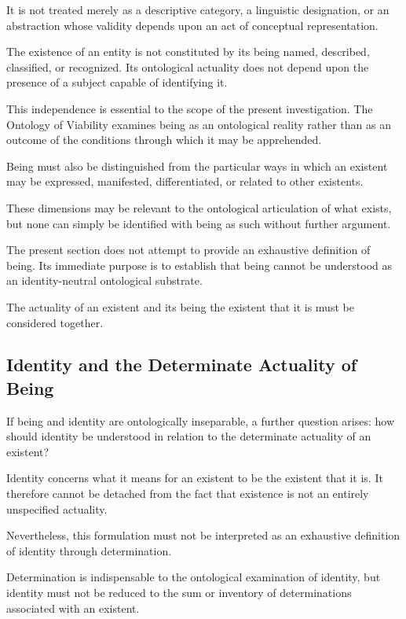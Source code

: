 It is not treated merely as a descriptive
category, a linguistic designation, or
an abstraction whose validity depends
upon an act of conceptual representation.

The existence of an entity is not constituted
by its being named, described, classified,
or recognized. Its ontological actuality
does not depend upon the presence of
a subject capable of identifying it.

This independence is essential to the
scope of the present investigation.
The Ontology of Viability examines being
as an ontological reality rather than
as an outcome of the conditions through
which it may be apprehended.

Being must also be distinguished from
the particular ways in which an existent
may be expressed, manifested, differentiated,
or related to other existents.

These dimensions may be relevant to the
ontological articulation of what exists,
but none can simply be identified with
being as such without further argument.

The present section does not attempt
to provide an exhaustive definition
of being. Its immediate purpose is
to establish that being cannot be
understood as an identity-neutral
ontological substrate.

The actuality of an existent and its
being the existent that it is must
be considered together.



\subsection{Identity and the Determinate Actuality of Being}

If being and identity are ontologically
inseparable, a further question arises:
how should identity be understood in
relation to the determinate actuality
of an existent?

Identity concerns what it means for
an existent to be the existent that it is.
It therefore cannot be detached from
the fact that existence is not an entirely
unspecified actuality.

Nevertheless, this formulation must not
be interpreted as an exhaustive definition
of identity through determination.

Determination is indispensable to the
ontological examination of identity,
but identity must not be reduced to
the sum or inventory of determinations
associated with an existent.

